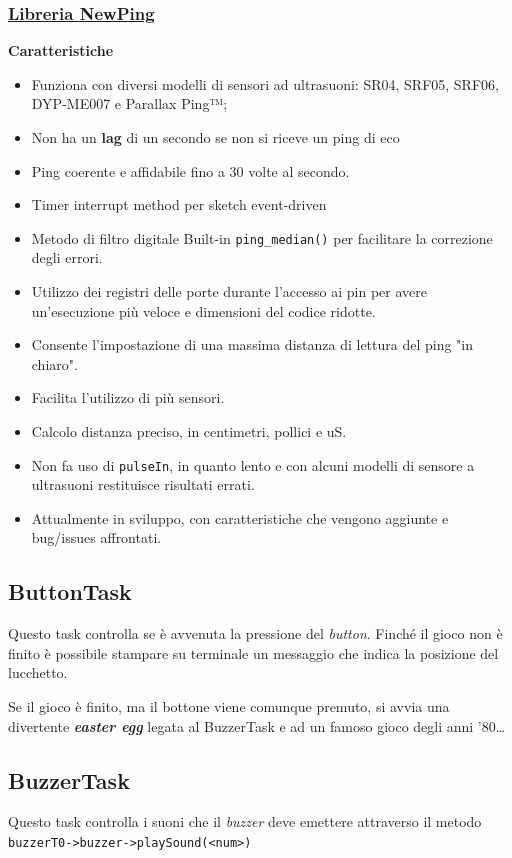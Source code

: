 \subsubsection{\underline{Libreria \href{http://playground.arduino.cc/Code/NewPing}{NewPing}}}\label{sec:newping}
\textbf{Caratteristiche}
\begin{itemize}
	\item Funziona con diversi modelli di sensori ad ultrasuoni: SR04, SRF05, SRF06, DYP-ME007 e Parallax Ping™;
	\item Non ha un \textbf{lag} di un secondo se non si riceve un ping di eco
	\item Ping coerente e affidabile fino a 30 volte al secondo.
	\item Timer interrupt method per sketch event-driven
	\item Metodo di filtro digitale Built-in \texttt{ping\_median()} per facilitare la correzione degli errori.
	\item Utilizzo dei registri delle porte durante l'accesso ai pin per avere un'esecuzione più veloce e dimensioni del codice ridotte.
	\item Consente l'impostazione di una massima distanza di lettura del ping "in chiaro".
	\item Facilita l'utilizzo di più sensori.
	\item Calcolo distanza preciso, in centimetri, pollici e uS.
	\item Non fa uso di \texttt{pulseIn}, in quanto lento e con alcuni modelli di sensore a ultrasuoni restituisce risultati errati.
	\item Attualmente in sviluppo, con caratteristiche che vengono aggiunte e bug/issues affrontati.
\end{itemize}


\subsection{ButtonTask}
Questo task controlla se è avvenuta la pressione del \textit{button}.
Finché il gioco non è finito è possibile stampare su terminale un messaggio che indica la posizione del lucchetto. 

Se il gioco è finito, ma il bottone viene comunque premuto, si avvia una divertente \textbf{\textit{easter egg}} legata al BuzzerTask e ad un famoso gioco degli anni '80\dots


\subsection{BuzzerTask}
Questo task controlla i suoni che il \textit{buzzer} deve emettere attraverso il metodo \texttt{buzzerT0->buzzer->playSound(<num>)}

